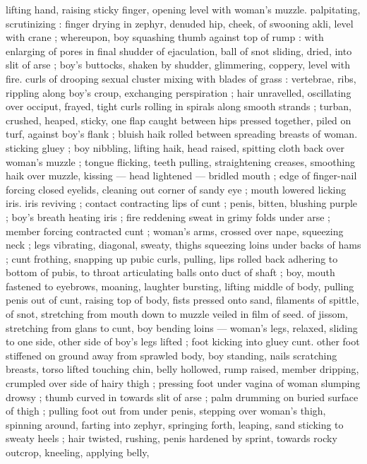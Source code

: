 lifting hand, raising sticky finger, opening level with woman's muzzle.
palpitating, scrutinizing : finger drying in zephyr, denuded hip,
cheek, of swooning akli, level with crane ; whereupon, boy squashing
thumb against top of rump : with enlarging of pores in final shudder
of ejaculation, ball of snot sliding, dried, into slit of arse ; boy's
buttocks, shaken by shudder, glimmering, coppery, level with fire.
curls of drooping sexual cluster mixing with blades of grass :
vertebrae, ribs, rippling along boy's croup, exchanging perspiration
; hair unravelled, oscillating over occiput, frayed, tight curls rolling in
spirals along smooth strands ; turban, crushed, heaped, sticky, one
flap caught between hips pressed together, piled on turf, against
boy's flank ; bluish haik rolled between spreading breasts of woman.
sticking gluey ; boy nibbling, lifting haik, head raised, spitting cloth
back over woman's muzzle ; tongue flicking, teeth pulling,
straightening creases, smoothing haik over muzzle, kissing --- head
lightened --- bridled mouth ; edge of finger-nail forcing closed
eyelids, cleaning out corner of sandy eye ; mouth lowered licking iris.
iris reviving ; contact contracting lips of cunt ; penis, bitten, blushing
purple ; boy’s breath heating iris ; fire reddening sweat in grimy folds
under arse ; member forcing contracted cunt ; woman's arms,
crossed over nape, squeezing neck ; legs vibrating, diagonal, sweaty,
thighs squeezing loins under backs of hams ; cunt frothing, snapping
up pubic curls, pulling, lips rolled back adhering to bottom of pubis,
to throat articulating balls onto duct of shaft ; boy, mouth fastened
to eyebrows, moaning, laughter bursting, lifting middle of body,
pulling penis out of cunt, raising top of body, fists pressed onto
sand, filaments of spittle, of snot, stretching from mouth down to
muzzle veiled in film of seed. of jissom, stretching from glans to
cunt, boy bending loins --- woman's legs, relaxed, sliding to one
side, other side of boy's legs lifted ; foot kicking into gluey cunt.
other foot stiffened on ground away from sprawled body, boy
standing, nails scratching breasts, torso lifted touching chin, belly
hollowed, rump raised, member dripping, crumpled over side of
hairy thigh ; pressing foot under vagina of woman slumping drowsy
; thumb curved in towards slit of arse ; palm drumming on buried
surface of thigh ; pulling foot out from under penis, stepping over
woman's thigh, spinning around, farting into zephyr, springing forth,
leaping, sand sticking to sweaty heels ; hair twisted, rushing, penis
hardened by sprint, towards rocky outcrop, kneeling, applying belly,
